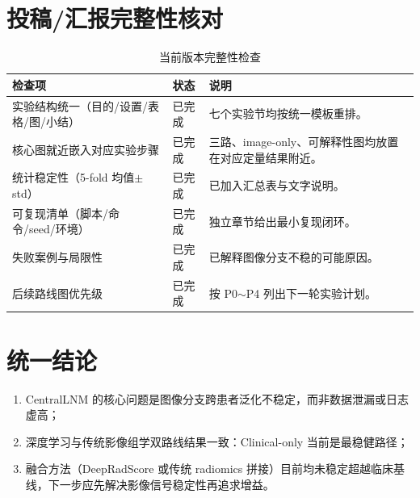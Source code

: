 \documentclass[12pt,a4paper]{ctexart}
\begin{document}
\section{投稿/汇报完整性核对}

\begin{table}[H]
\centering
\caption{当前版本完整性检查}
\begin{tabular}{p{}p{}p{}}
\toprule
检查项 & 状态 & 说明 \\
\midrule
实验结构统一（目的/设置/表格/图/小结） & 已完成 & 七个实验节均按统一模板重排。 \\
核心图就近嵌入对应实验步骤 & 已完成 & 三路、image-only、可解释性图均放置在对应定量结果附近。 \\
统计稳定性（5-fold 均值$\pm$std） & 已完成 & 已加入汇总表与文字说明。 \\
可复现清单（脚本/命令/seed/环境） & 已完成 & 独立章节给出最小复现闭环。 \\
失败案例与局限性 & 已完成 & 已解释图像分支不稳的可能原因。 \\
后续路线图优先级 & 已完成 & 按 P0$\sim$P4 列出下一轮实验计划。 \\
\bottomrule
\end{tabular}
\end{table}

\section{统一结论}

\begin{enumerate}
  \item CentralLNM 的核心问题是图像分支跨患者泛化不稳定，而非数据泄漏或日志虚高；
  \item 深度学习与传统影像组学双路线结果一致：Clinical-only 当前是最稳健路径；
  \item 融合方法（DeepRadScore 或传统 radiomics 拼接）目前均未稳定超越临床基线，下一步应先解决影像信号稳定性再追求增益。
\end{enumerate}
\end{document}
